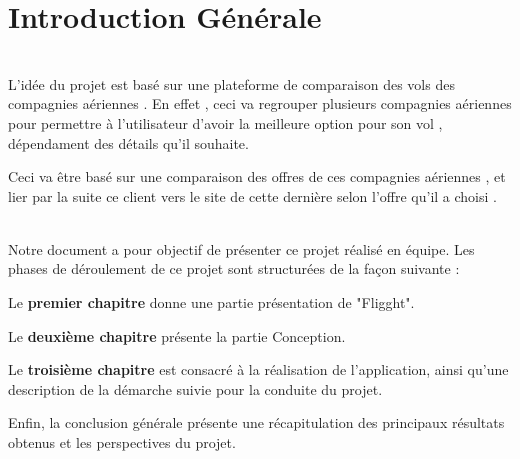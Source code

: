 \chapter*{Introduction Générale}


\\ L'idée du projet est basé sur une plateforme de comparaison des vols des compagnies aériennes . En effet , ceci va regrouper plusieurs compagnies aériennes pour permettre à l'utilisateur d'avoir la meilleure option pour son vol , dépendament des détails qu'il souhaite.
\\ \par
Ceci va être basé sur une comparaison des offres de ces compagnies aériennes , et lier par la suite ce client vers le site de cette dernière selon l'offre qu'il a choisi . \\

\\ \par
Notre document a pour objectif de présenter ce projet réalisé en équipe. Les phases de déroulement de ce projet sont structurées de la façon
suivante :
\\ \par
Le \textbf{premier chapitre} donne une partie présentation de "Fligght".

Le \textbf{deuxième chapitre} présente la partie Conception. 

Le \textbf{troisième chapitre} est consacré à la réalisation de l'application, ainsi qu'une description de la démarche suivie pour la conduite du projet.

\vspace{2cm}
Enfin, la conclusion générale présente une récapitulation des principaux résultats obtenus et
les perspectives du projet. 
\makeatletter
\renewcommand{\thesection}{\@arabic\c@section}
\makeatother
